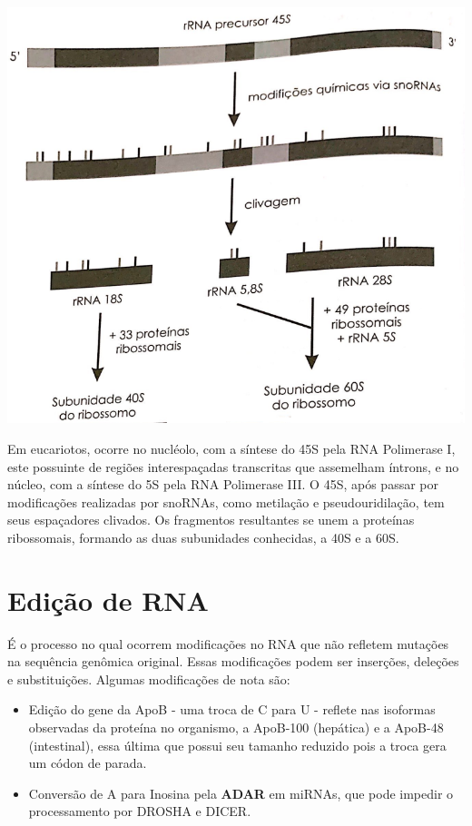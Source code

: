 \documentclass[
]{book}
\begin{document}
\includegraphics{./pics/rRNA synthesis.png}

Em eucariotos, ocorre no nucléolo, com a síntese do 45S pela RNA Polimerase I, este possuinte de regiões interespaçadas transcritas que assemelham íntrons, e no núcleo, com a síntese do 5S pela RNA Polimerase III. O 45S, após passar por modificações realizadas por snoRNAs, como metilação e pseudouridilação, tem seus espaçadores clivados. Os fragmentos resultantes se unem a proteínas ribossomais, formando as duas subunidades conhecidas, a 40S e a 60S.

\hypertarget{ediuxe7uxe3o-de-rna}{%
\section{Edição de RNA}\label{ediuxe7uxe3o-de-rna}}

É o processo no qual ocorrem modificações no RNA que não refletem mutações na sequência genômica original. Essas modificações podem ser inserções, deleções e substituições. Algumas modificações de nota são:

\begin{itemize}
\item
  Edição do gene da ApoB - uma troca de C para U - reflete nas isoformas observadas da proteína no organismo, a ApoB-100 (hepática) e a ApoB-48 (intestinal), essa última que possui seu tamanho reduzido pois a troca gera um códon de parada.
\item
  Conversão de A para Inosina pela \textbf{ADAR} em miRNAs, que pode impedir o processamento por DROSHA e DICER.
\end{itemize}
\end{document}

